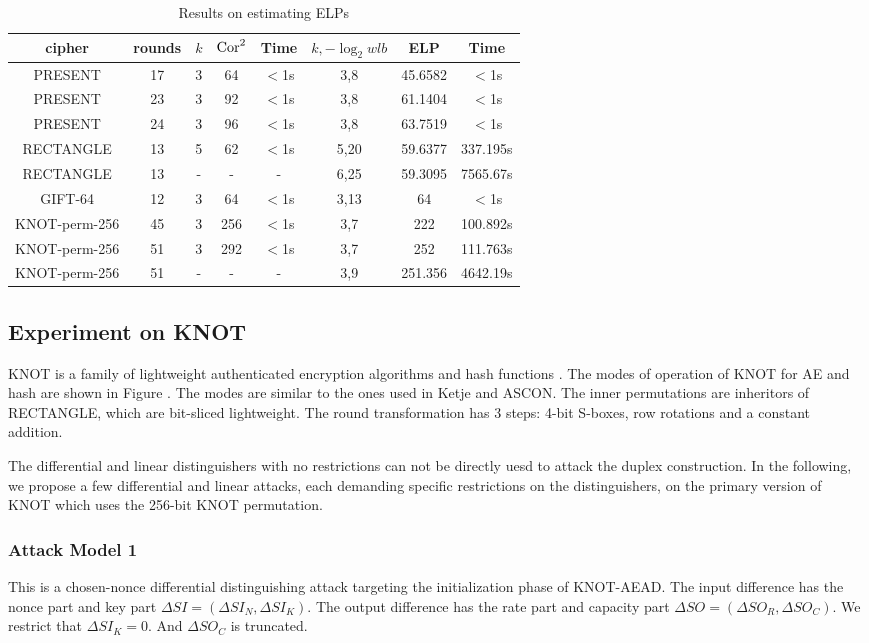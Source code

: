 \begin{table}
	\caption{Results on estimating ELPs}\label{tab:ELP}
	\centering
	\begin{tabular}{|c|c|c|c|c|c|c|c|}
		\hline
		cipher & rounds & $k$ & $\text{Cor}^2$ & Time & $k,-\log_2wlb$ & ELP & Time \\
		\hline
		PRESENT & 17 & 3 & 64 & $<$1s & 3,8 & 45.6582 & $<$1s\\
		\hline 
		PRESENT & 23 & 3 & 92 & $<$1s & 3,8 & 61.1404 & $<$1s\\
		\hline 
		PRESENT & 24 & 3 & 96 & $<$1s & 3,8 & 63.7519 & $<$1s\\
		\hline 
		RECTANGLE & 13 & 5 & 62 & $<$1s & 5,20 & 59.6377 & 337.195s \\
		\hline
		RECTANGLE & 13 & - & - & - & 6,25 & 59.3095 & 7565.67s \\
		\hline
		GIFT-64 & 12 & 3 & 64 & $<$1s& 3,13 & 64 & $<$1s \\
		\hline
		KNOT-perm-256 & 45 & 3 & 256 & $<$1s & 3,7 & 222 & 100.892s\\
		KNOT-perm-256 & 51 & 3 & 292 & $<$1s & 3,7 & 252 & 111.763s\\
		KNOT-perm-256 & 51 & - & - & - & 3,9 & 251.356 & 4642.19s\\
		\hline
	\end{tabular}
\end{table}

\subsection{Experiment on KNOT}

KNOT is a family of lightweight authenticated encryption algorithms and hash functions \cite{ZDY19}. The modes of operation of KNOT for AE and hash are shown in Figure . The modes are similar to the ones used in Ketje and ASCON. The inner permutations are inheritors of RECTANGLE, which are bit-sliced lightweight. The round transformation has 3 steps: 4-bit S-boxes, row rotations and a constant addition. 

The differential and linear distinguishers with no restrictions can not be directly uesd to attack the duplex construction. In the following, we propose a few differential and linear attacks, each demanding specific restrictions on the distinguishers, on the primary version of KNOT which uses the 256-bit KNOT permutation.

\subsubsection{Attack Model 1}
This is a chosen-nonce differential distinguishing attack targeting the initialization phase of KNOT-AEAD. The input difference has the nonce part and key part $\Delta SI=(\Delta SI_N,\Delta SI_K)$. The output difference has the rate part and capacity part $\Delta SO=(\Delta SO_R,\Delta SO_C)$. We restrict that $\Delta SI_K=0$. And $\Delta SO_C$ is truncated.  

